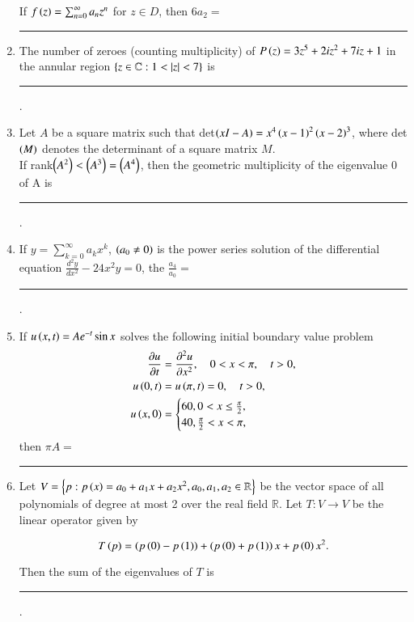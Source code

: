 \documentclass[journal,12pt,onecolumn]{IEEEtran}
\theoremstyle{remark}
\begin{document}
\begin{enumerate}
If $f\left(z\right) = \sum^\infty_{n=0}a_nz^n$ for $z \in D$, then $6a_2=$\rule{2cm}{0.15mm}
\item The number of zeroes (counting multiplicity) of $P\left(z\right) = 3z^5+2iz^2+7iz+1$ in the annular region $\left\{z\in \mathbb{C}:1<\left\vert z\right\vert<7\right\}$ is \rule{2cm}{0.15mm}.
\item Let $A$ be a square matrix such that det$\left(xI-A\right)=x^4\left(x-1\right)^2\left(x-2\right)^3$, where det$\left(M\right)$ denotes the determinant of a square matrix $M$.\\
If rank$\left(A^2\right)<\left(A^3\right)=\left(A^4\right)$, then the geometric multiplicity of the eigenvalue 0 of A is \rule{2cm}{0.15mm}.
\item If $y = \sum^\infty_{k=0}a_kx^k$, $\left(a_0\neq0\right)$ is the power series solution of the differential equation $\frac{d^2y}{dx^2}-24x^2y=0$, the $\frac{a_4}{a_0}=$ \rule{2cm}{0.15mm}.
\item If $u\left(x,t\right)=Ae^{-t}\sin x$ solves the following initial boundary value problem\\
\begin{align*}
    \frac{\partial u}{\partial t} &= \frac{\partial^2 u}{\partial x^2}, \quad 0 < x < \pi, \quad t > 0, \\
    u\left(0,t\right) &= u\left(\pi,t\right) = 0, \quad t > 0, \\
    u\left(x,0\right) &= \begin{cases}
        60,  0 < x \leq \frac{\pi}{2}, \\
        40,  \frac{\pi}{2} < x < \pi,
    \end{cases}
\end{align*}
then $\pi A=$\rule{2cm}{0.15mm}
\item Let $V = \left\{p: p\left(x\right) = a_0 + a_1x + a_2x^2, a_0, a_1, a_2 \in \mathbb{R}\right\}$ be the vector space of all polynomials of degree at most 2 over the real field $\mathbb{R}$. Let $T: V \rightarrow V$ be the linear operator given by

$$T\left(p\right) = \left(p\left(0\right) - p\left(1\right)\right) + \left(p\left(0\right) + p\left(1\right)\right)x + p\left(0\right)x^2.$$

Then the sum of the eigenvalues of $T$ is \rule{2cm}{0.15mm}.
\end{enumerate}
\end{document}

